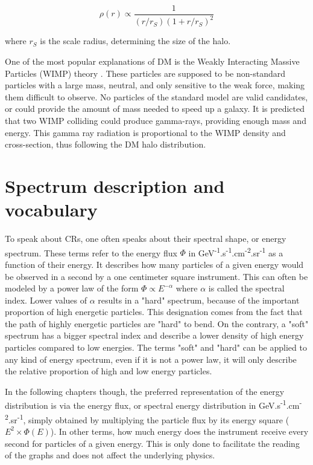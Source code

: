 \begin{equation}
\rho (r) \propto \frac{1}{\left( r/r_S \right) \left( 1 + r/r_S \right)^2 }
\end{equation}

where $r_S$ is the scale radius, determining the size of the halo. 


One of the most popular explanations of DM is the Weakly Interacting Massive Particles (WIMP) theory . These particles are supposed to be non-standard particles with a large mass, neutral, and only sensitive to the weak force, making them difficult to observe. No particles of the standard model are valid candidates, or could provide the amount of mass needed to speed up a galaxy.
It is predicted that two WIMP colliding could produce gamma-rays, providing enough mass and energy. This gamma ray radiation is proportional to the WIMP density and cross-section, thus following the DM halo distribution.

\newpage
\section{Spectrum description and vocabulary}

To speak about CRs, one often speaks about their spectral shape, or energy spectrum. These terms refer to the energy flux $\Phi$ in GeV\textsuperscript{-1}.s\textsuperscript{-1}.cm\textsuperscript{-2}.sr\textsuperscript{-1} as a function of their energy. It describes how many particles of a given energy would be observed in a second by a one centimeter square instrument. This can often be modeled by a power law of the form $\Phi \propto E^{-\alpha}$  where $\alpha$ is called the spectral index. Lower values of $\alpha$ results in a "hard" spectrum, because of the important proportion of high energetic particles. This designation comes from the fact that the path of highly energetic particles are "hard" to bend. On the contrary, a "soft" spectrum has a bigger spectral index and describe a lower density of high energy particles compared to low energies. The terms "soft" and "hard" can be applied to any kind of energy spectrum, even if it is not a power law, it will only describe the relative proportion of high and low energy particles.

In the following chapters though, the preferred representation of the energy distribution is via the energy flux, or spectral energy distribution in GeV.s\textsuperscript{-1}.cm\textsuperscript{-2}.sr\textsuperscript{-1}, simply obtained by multiplying the particle flux by its energy square ($E^2 \times \Phi(E)$). In other terms, how much energy does the instrument receive every second for particles of a given energy. This is only done to facilitate the reading of the graphs and does not affect the underlying physics.



